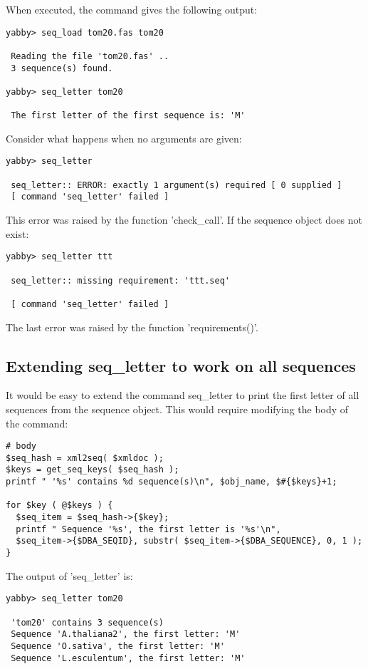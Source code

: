 When executed, the command gives the following output:

\begin{verbatim}
yabby> seq_load tom20.fas tom20

 Reading the file 'tom20.fas' ..
 3 sequence(s) found.

yabby> seq_letter tom20

 The first letter of the first sequence is: 'M'
\end{verbatim}

Consider what happens when no arguments are given:

\begin{verbatim}
yabby> seq_letter 

 seq_letter:: ERROR: exactly 1 argument(s) required [ 0 supplied ]
 [ command 'seq_letter' failed ]
\end{verbatim}

This error was raised by the function 'check\_call'. If the sequence
object does not exist:

\begin{verbatim}
yabby> seq_letter ttt

 seq_letter:: missing requirement: 'ttt.seq'

 [ command 'seq_letter' failed ]
\end{verbatim}

The last error was raised by the function 'requirements()'.

\subsection{Extending seq\_letter to work on all sequences}

It would be easy to extend the command seq\_letter to print the
first letter of all sequences from the sequence object. This would
require modifying the body of the command:

\begin{verbatim}
# body
$seq_hash = xml2seq( $xmldoc );
$keys = get_seq_keys( $seq_hash );
printf " '%s' contains %d sequence(s)\n", $obj_name, $#{$keys}+1;

for $key ( @$keys ) {
  $seq_item = $seq_hash->{$key};
  printf " Sequence '%s', the first letter is '%s'\n",
  $seq_item->{$DBA_SEQID}, substr( $seq_item->{$DBA_SEQUENCE}, 0, 1 );
}
\end{verbatim}

The output of 'seq\_letter' is:

\begin{verbatim}
yabby> seq_letter tom20

 'tom20' contains 3 sequence(s)
 Sequence 'A.thaliana2', the first letter: 'M'
 Sequence 'O.sativa', the first letter: 'M'
 Sequence 'L.esculentum', the first letter: 'M'
\end{verbatim}

